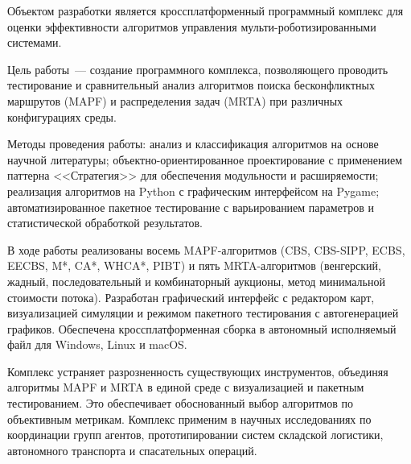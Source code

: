 \abstract %


Объектом разработки является кроссплатформенный программный комплекс для оценки эффективности алгоритмов управления мульти-роботизированными системами.

Цель работы~--- создание программного комплекса, позволяющего проводить тестирование и сравнительный анализ алгоритмов поиска бесконфликтных маршрутов (MAPF) и распределения задач (MRTA) при различных конфигурациях среды.

Методы проведения работы: анализ и классификация алгоритмов на основе научной литературы; объектно-ориентированное проектирование с применением паттерна <<Стратегия>> для обеспечения модульности и расширяемости; реализация алгоритмов на Python с графическим интерфейсом на Pygame; автоматизированное пакетное тестирование с варьированием параметров и статистической обработкой результатов.

В ходе работы реализованы восемь MAPF-алгоритмов (CBS, CBS-SIPP, ECBS, EECBS, M*, CA*, WHCA*, PIBT) и пять MRTA-алгоритмов (венгерский, жадный, последовательный и комбинаторный аукционы, метод минимальной стоимости потока). Разработан графический интерфейс с редактором карт, визуализацией симуляции и режимом пакетного тестирования с автогенерацией графиков. Обеспечена кроссплатформенная сборка в автономный исполняемый файл для Windows, Linux и macOS.

Комплекс устраняет разрозненность существующих инструментов, объединяя алгоритмы MAPF и MRTA в единой среде с визуализацией и пакетным тестированием. Это обеспечивает обоснованный выбор алгоритмов по объективным метрикам. Комплекс применим в научных исследованиях по координации групп агентов, прототипировании систем складской логистики, автономного транспорта и спасательных операций.